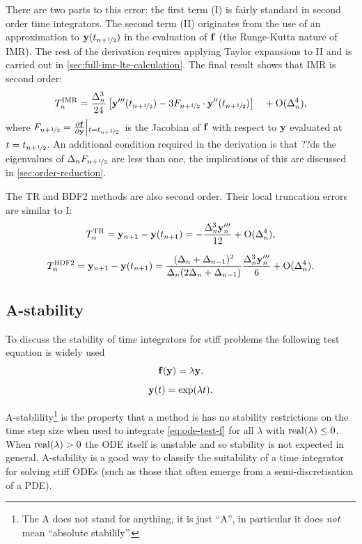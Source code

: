 There are two parts to this error: the first term (I) is fairly standard in second order time integrators.
The second term (II) originates from the use of an approximation to $\mathbf{y}(t_{n+\nicefrac{1}{2}})$ in the evaluation of ${\mathbf{f}}$ (\ie the Runge-Kutta nature of IMR).
The rest of the derivation requires applying Taylor expansions to II and is carried out in \autoref{sec:full-imr-lte-calculation}.
The final result shows that IMR is second order:
\begin{equation}
  \lte^\imr = \frac{\dtn^3}{24} \left[\yvhf['''] - 3 \dfdyhf \cdot \yvhf[''] \right]
  \porder{\dtn^4},
  \label{eq:trunc-final}
\end{equation}
where $F_{n+\nicefrac{1}{2}} = \frac{\partial {\mathbf{f}}}{\partial \mathbf{y}}{\left|_{t=t_{n+\nicefrac{1}{2}}}\right.}$ is the Jacobian of ${\mathbf{f}}$ with respect to $\mathbf{y}$ evaluated at $t=t_{n+\nicefrac{1}{2}}$.
An additional condition required in the derivation is that ??ds the eigenvalues of $\Delta_{n}F_{n+\nicefrac{1}{2}}$ are less than one, the implications of this are discussed in \autoref{sec:order-reduction}.

The TR\cite[261]{GreshoSani} and BDF2\cite[715]{GreshoSani} methods are also second order.
Their local truncation errors are similar to I:
\begin{equation}
  \label{eq:tr-lte}
  \lte^\tr = \yv_{n+1} - \yv(t_{n+1}) = -\frac{\dtn^3 \yv_n'''}{12}
  + \order{\dtn^4},
\end{equation}

\begin{equation}
  \label{eq:bdf2-lte}
  \lte^\bdf = \yv_{n+1} - \yv(t_{n+1}) = \frac{(\dtn + \dtx{n-1})^2}{\dtn(2\dtn + \dtx{n-1})}
  \frac{\dtn^3 \yv_n'''}{6}
  + \order{\dtn^4}.
\end{equation}


\subsection{A-stability}

To discuss the stability of time integrators for stiff problems the following test equation is widely used
\begin{equation}
  \ffv{\yv} = \lambda \yv,
  \label{eq:ode-test-f}
\end{equation}
\ie
\begin{equation}
  \mathbf{y}(t) = \exp(\lambda t).
\end{equation}

A-stablility\footnote{The A does not stand for anything, it is just ``A''\cite[40]{HairerWanner}, in particular it does \emph{not} mean ``absolute stabilily''.} is the property that a method is has no stability restrictions on the time step size when used to integrate \eqref{eq:ode-test-f} for all $\lambda$ with $\operatorname{real}(\lambda) \leq 0$.
When $\operatorname{real}(\lambda) > 0$ the ODE itself is unstable and so stability is not expected in general.
A-stability is a good way to classify the suitability of a time integrator for solving stiff ODEs (such as those that often emerge from a semi-discretisation of a PDE).

